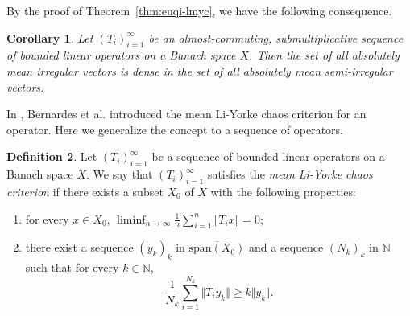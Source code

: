 \documentclass[12pt,a4paper]{amsart}
\theoremstyle{definition}
\newtheorem{defn}{Definition}[section]
\theoremstyle{plain}
\newtheorem{coro}[defn]{Corollary}
\begin{document}
By the proof of Theorem~\ref{thm:euqi-lmyc}, we have the following consequence.
\begin{coro}
    Let $(T_i)_{i=1}^{\infty}$ be an almost-commuting, submultiplicative sequence of bounded linear operators on a Banach space $X$.
    Then the set of all absolutely mean irregular vectors is dense in the set of all absolutely mean semi-irregular vectors.
\end{coro}

In \cite{BBP2020}, Bernardes et al. introduced the mean Li-Yorke chaos criterion for an operator. Here we generalize the concept to a sequence of operators.

\begin{defn}
    Let $(T_i)_{i=1}^\infty$ be a sequence of bounded linear operators on a Banach space $X$.
    We say that $(T_i)_{i=1}^\infty$ satisfies the \emph{mean Li-Yorke chaos criterion} if there exists a subset $X_0$ of $X$ with the following properties:
    \begin{enumerate}
        \item for every $x\in X_0$, $\liminf_{n\to \infty} \frac{1}{n} \sum_{i=1}^n \Vert T_ix \Vert=0$;
        \item there exist a sequence $(y_k)_k$ in $\overline{ \text{span}(X_0)}$ and a sequence $(N_k)_k$ in $\mathbb{N}$ such that for every $k\in \mathbb{N}$,
              \[
                  \frac{1}{N_k} \sum_{i=1}^{N_k} \Vert T_iy_k \Vert \ge k \Vert y_k \Vert.
              \]
    \end{enumerate}
\end{defn}
\end{document}
